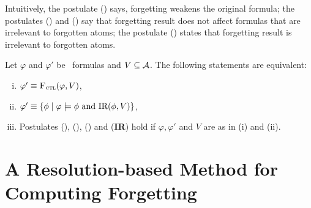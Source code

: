 \documentclass[twoside,11pt]{article}
\begin{document}
%
Intuitively, the postulate (\W) says, forgetting weakens the original formula; the postulates  (\PP) and (\NgP)
say that forgetting result does not affect formulas that are irrelevant to forgotten atoms; the postulate (\textbf{\IR}) states that
forgetting result is irrelevant to forgotten atoms.




\begin{theorem}\label{thm:close}
	Let $\varphi$ and $\varphi'$ be \CTL\ formulas and $V \subseteq {\cal A}$.
	The following statements are equivalent:
	\begin{enumerate}[(i)]
		\item $\varphi' \equiv {\textsc{F}_{\textsc{ctl}}}(\varphi, V)$,
		\item $\varphi'\equiv \{\phi \mid\varphi \models \phi \text{ and } \textrm{IR}(\phi, V)\}$,
		\item Postulates (\W), (\PP), (\NgP) and (\textbf{IR}) hold if $\varphi,   \varphi'$ and $V$ are as in (i) and (ii).
	\end{enumerate}
\end{theorem}


\section{A Resolution-based Method for Computing Forgetting}
\label{sec:resolution}

\end{document}
